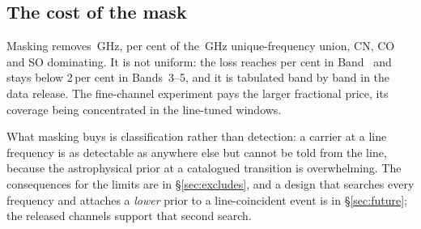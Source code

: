 \subsection{The cost of the mask}
\label{sec:linecost}

Masking removes \FrMaskLostGHz\,GHz, \FrMaskPct{} per cent of the
\FrMaskUnionGHz\,GHz unique-frequency union, CN, CO and SO dominating. It
is not uniform: the loss reaches \FrMaskWorstPct{} per cent in
Band~\FrMaskWorstBand{} and stays below 2\,per cent in Bands~3--5, and it
is tabulated band by band in the data release. The fine-channel experiment
pays the larger fractional price, its coverage being concentrated in the
line-tuned windows.

What masking buys is classification rather than detection: a carrier at a
line frequency is as detectable as anywhere else but cannot be told from the
line, because the astrophysical prior at a catalogued transition is
overwhelming. The consequences for the limits are in
\S\ref{sec:excludes}, and a design that searches every frequency and
attaches a \emph{lower} prior to a line-coincident event
\citep{CocconiMorrison1959} is in \S\ref{sec:future}; the released
channels support that second search.
